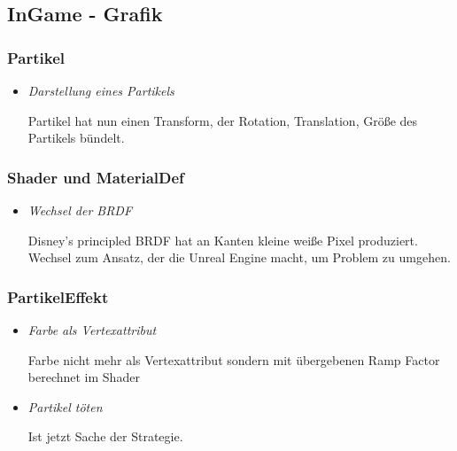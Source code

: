 \subsection{InGame - Grafik}

\subsubsection{Partikel}
\begin{itemize}
    \item \textit{Darstellung eines Partikels}
        \begin{leftbar}[0.9\linewidth]
            Partikel hat nun einen Transform, der Rotation, Translation, Größe
            des Partikels bündelt.
        \end{leftbar}
\end{itemize}

\subsubsection{Shader und MaterialDef}
\begin{itemize}
    \item \textit{Wechsel der BRDF}
        \begin{leftbar}[0.9\linewidth]
            Disney's principled BRDF hat an Kanten kleine weiße Pixel produziert.
            Wechsel zum Ansatz, der die Unreal Engine macht, um Problem zu umgehen.
        \end{leftbar}
\end{itemize}

\subsubsection{PartikelEffekt}
\begin{itemize}
    \item \textit{Farbe als Vertexattribut}
        \begin{leftbar}[0.9\linewidth]
        Farbe nicht mehr als Vertexattribut sondern mit übergebenen Ramp Factor berechnet im Shader
        \end{leftbar}
    \item \textit{Partikel töten}
        \begin{leftbar}[0.9\linewidth]
        Ist jetzt Sache der Strategie.
        \end{leftbar}
\end{itemize}

